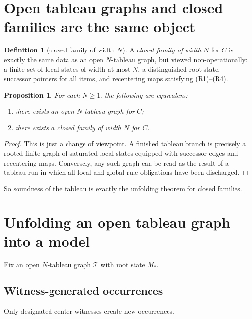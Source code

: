\documentclass[11pt]{article}
\newtheorem{proposition}[theorem]{Proposition}
\theoremstyle{definition}
\newtheorem{definition}[theorem]{Definition}
\begin{document}
\section{Open tableau graphs and closed families are the same object}

\begin{definition}[closed family of width $N$]
A \emph{closed family of width $N$} for $C$ is exactly the same data as an open $N$-tableau graph, but viewed non-operationally: a finite set of local states of width at most $N$, a distinguished root state, successor pointers for all items, and recentering maps satisfying \textup{(R1)--(R4)}.
\end{definition}

\begin{proposition}\label{prop:eqv}
For each $N\geq 1$, the following are equivalent:
\begin{enumerate}[label=(\roman*)]
    \item there exists an open $N$-tableau graph for $C$;
    \item there exists a closed family of width $N$ for $C$.
\end{enumerate}
\end{proposition}

\begin{proof}
This is just a change of viewpoint. A finished tableau branch is precisely a rooted finite graph of saturated local states equipped with successor edges and recentering maps. Conversely, any such graph can be read as the result of a tableau run in which all local and global rule obligations have been discharged.
\end{proof}

So soundness of the tableau is exactly the unfolding theorem for closed families.

\section{Unfolding an open tableau graph into a model}

Fix an open $N$-tableau graph $\mathcal T$ with root state $M_\ast$.

\subsection{Witness-generated occurrences}

Only designated center witnesses create new occurrences.
\end{document}
